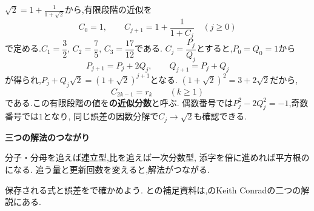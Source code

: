 $\sqrt2=1+\frac1{1+\sqrt2}$から,有限段階の近似を
\[
  C_0=1,\qquad C_{j+1}=1+\frac1{1+C_j}
  \quad(j\ge0)
\]
で定める.$C_1=\dfrac{3}{2}$, $C_2=\dfrac{7}{5}$, $C_3=\dfrac{17}{12}$である.
$C_j=\dfrac{P_j}{Q_j}$とすると,$P_0=Q_0=1$から
\[
  P_{j+1}=P_j+2Q_j,\qquad Q_{j+1}=P_j+Q_j
\]
が得られ,$P_j+Q_j\sqrt2=(1+\sqrt2)^{j+1}$となる.
$(1+\sqrt2)^2=3+2\sqrt2$だから,
\[
  C_{2k-1}=r_k\qquad(k\ge1)
\]
である.この有限段階の値を\textbf{の近似分数}と呼ぶ.
偶数番号では$P_j^2-2Q_j^2=-1$,奇数番号では$1$となり,
同じ誤差の因数分解で$C_j\to\sqrt2$も確認できる.

\begin{bookpoint}
  \textbf{三つの解法のつながり}\par
  分子・分母を追えば連立型,比を追えば一次分数型,
  添字を倍に進めれば平方根のになる.
  追う量と更新回数を変えると,解法がつながる.
\end{bookpoint}
保存される式と誤差をで確かめよう.
との補足資料は,のKeith Conradの二つの解説にある.
